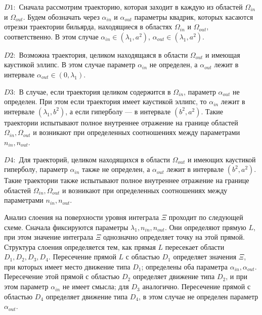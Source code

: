 $D1:$ Сначала рассмотрим траекторию, которая заходит в каждую из областей $\Omega_{in}$ и $\Omega_{out}$.
Будем обозначать через $\alpha_{in}$ и $\alpha_{out}$ параметры квадрик, которых касаются отрезки траектории бильярда, находящиеся в областях $\Omega_{in}$ и $\Omega_{out}$, соответственно. В этом случае  $\alpha_{in} \in (\lambda_1, a^2)$, $\alpha_{out} \in (\lambda_1, a^2)$.

$D2:$ Возможна траектория, целиком находящаяся в области $\Omega_{out}$ и имеющая каустикой эллипс. В этом случае параметр $\alpha_{in}$ не определен, а $\alpha_{out}$ лежит в интервале $\alpha_{out} \in (0, \lambda_1)$.

$D3:$ В случае, если траектория целиком содержится в $\Omega_{in}$, параметр $\alpha_{out}$ не определен. При этом если траектория имеет каустикой эллипс, то $\alpha_{in}$ лежит в интервале $(\lambda_1, b^2)$, а если гиперболу --- в интервале $(b^2, a^2)$.
 Такие траектории испытывают полное внутреннее отражение на границе областей $\Omega_{in}, \Omega_{out}$ и возникают при определенных соотношениях между параметрами $n_{in}, n_{out}$. 

$D4:$ Для траекторий, целиком находящихся в области $\Omega_{out}$ и имеющих каустикой гиперболу,  параметр $\alpha_{in}$ также не определен, а $\alpha_{out}$ лежит в интервале $(b^2, a^2)$.
Такие траектории также испытывают полное внутреннее отражение на границе областей $\Omega_{in}, \Omega_{out}$ и возникают при определенных соотношениях между параметрами $n_{in}, n_{out}$.


Анализ слоения на поверхности уровня интеграла $\Xi$ проходит по следующей схеме.
Сначала фиксируются параметры $\lambda_1, n_{in}, n_{out}$. Они определяют прямую $L$, при этом значение интеграла $\Xi$ однозначно определяет точку на этой прямой. Структура слоения определяется тем, как прямая $L$ пересекает области $D_1, D_2, D_3, D_4$.
Пересечение прямой $L$ с областью $D_1$ определяет значения $\Xi$, при которых имеет место движение типа $D_1$; определены оба параметра $\alpha_{in}, \alpha_{out}$.
Пересечение этой прямой с областью $D_2$ определяет движение типа $D_2$, и при этом  параметр $\alpha_{in}$ не имеет смысла; для $D_3$ аналогично. 
Пересечение прямой с областью $D_4$ определяет движение типа $D_4$, в этом случае не  определен параметр $\alpha_{out}$.


